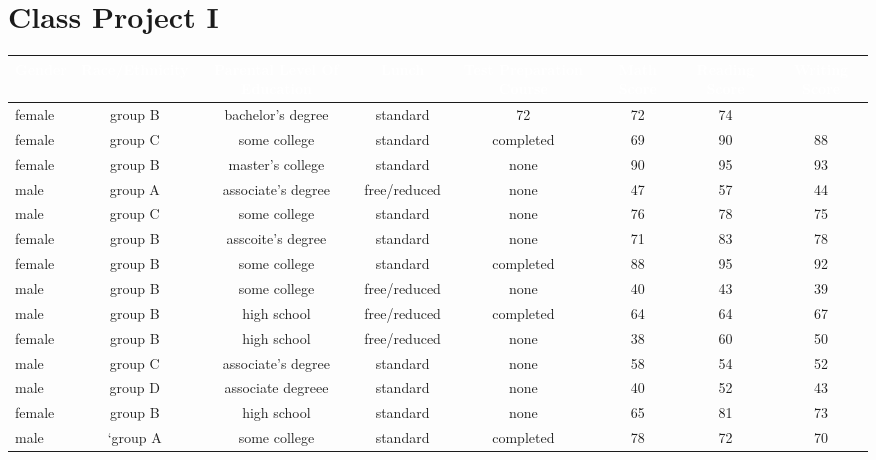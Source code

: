 \documentclass{article}
\begin{document}
	\section{Class Project I}
	\begin{sidewaystable}
		\begin{center}
			\label{tab:table1}
			\begin{tabular}{|l|c|c|c|c|c|c|c|}
				\hline
				\cellcolor{blue!100}\textcolor{white}{\textbf{Gender}} & \cellcolor{blue!100}\textcolor{white}{\textbf{Race/Ethnicity}} & \cellcolor{blue!100}\textcolor{white}{\textbf{Parental Level Of Education}} &
				\cellcolor{blue!100}\textcolor{white}{\textbf{Lunch}} &
				\cellcolor{blue!100}\textcolor{white}{\textbf{Test Preparation Course}} &
				\cellcolor{blue!100}\textcolor{white}{\textbf{Math Score}} &
				\cellcolor{blue!100}\textcolor{white}{\textbf{Reading Score}} &
				\cellcolor{blue!100}\textcolor{white}{\textbf{Writing Score}}\\
				\hline
				female & group B & bachelor's degree & standard & 72 &72 & 74 \\
				\hline
				female & group C & some college & standard & completed & 69 & 90 & 88\\
				\hline
				female & group B & master's college & standard & none & 90 & 95 & 93\\
				\hline
				male & group A & associate's degree & free/reduced & none & 47 & 57 & 44\\
				\hline
				male & group C & some college & standard & none & 76 & 78 & 75\\
				\hline
				female & group B & asscoite's degree & standard & none & 71 & 83 & 78\\
				\hline
				female & group B & some college & standard & completed & 88 & 95 & 92\\
				\hline
				male & group B & some college & free/reduced & none & 40 & 43 & 39\\
				\hline
				male & group B &high school & free/reduced & completed & 64 & 64 & 67\\
				\hline
				female & group B & high school & free/reduced & none & 38 & 60 & 50\\
				\hline
				male & group C & associate's degree & standard & none & 58 & 54 & 52\\
				\hline
				male & group D & associate degreee & standard & none & 40 & 52 & 43\\
				\hline
				female & group B & high school & standard & none & 65 & 81 & 73\\
				\hline
				male & `group A & some college & standard & completed & 78 & 72 & 70\\
				\hline
				
				
			\end{tabular}
		\end{center}
	\end{sidewaystable}
\end{document}
